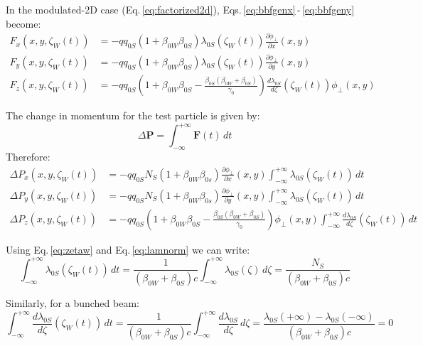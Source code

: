 In the modulated-2D case (Eq.\,\ref{eq:factorized2d}), Eqs.\,\eqref{eq:bbfgenx}\,-\,\eqref{eq:bbfgeny} become:
\begin{align}
F_x(x, y, \zeta_W(t)) &=  -q q_{0S} (1+\beta_{0W}  \beta_{0S})
\lambda_{0S}(\zeta_W(t))
 \frac{\partial \phi_\perp}{\partial x}(x, y ) \\
F_y(x, y, \zeta_W(t)) &=  -qq_{0S}  (1+\beta_{0W}  \beta_{0S})
\lambda_{0S}(\zeta_W(t))
 \frac{\partial \phi_\perp}{\partial y}(x, y ) \\
F_z(x, y, \zeta_W(t)) &=  -qq_{0S}\left(1+\beta_{0W}  \beta_{0S} -\frac{\beta_{0S}(\beta_{0W}+\beta_{0S})}{\gamma_0}\right) \frac{d \lambda_{0S}}{d \zeta}(\zeta_W(t)) \phi_\perp(x, y)
\end{align}

The change in momentum for the test particle is given by:
\begin{equation}
\Delta \textbf{P} = \int_{-\infty}^{+\infty} \textbf{F}(t) \,dt
\end{equation}
Therefore:
\begin{align}
\Delta P_x(x, y, \zeta_W(t)) &=  -qq_{0S} N_S (1+\beta_{0W}  \beta_{0s})
\frac{\partial \phi_\perp}{\partial x}(x, y ) \int_{-\infty}^{+\infty}\lambda_{0S}(\zeta_W(t)) \,dt\\
\Delta P_y(x, y, \zeta_W(t)) &=  -qq_{0S} N_S (1+\beta_{0W}  \beta_{0s})
 \frac{\partial \phi_\perp}{\partial y}(x, y ) \int_{-\infty}^{+\infty}\lambda_{0S}(\zeta_W(t)) \,dt\\
\Delta P_z(x, y, \zeta_W(t)) &=  -qq_{0S}\left(1+\beta_{0W}  \beta_{0S} -\frac{\beta_{0S}(\beta_{0W}+\beta_{0S})}{\gamma_0}\right) \phi_\perp(x, y) \int_{-\infty}^{+\infty}\frac{d \lambda_{0S}}{d \zeta}(\zeta_W(t)) \, dt
\end{align}

Using Eq.\,\eqref{eq:zetaw} and Eq.\,\eqref{eq:lamnorm} we can write:
\begin{equation}
\int_{-\infty}^{+\infty}\lambda_{0S}(\zeta_W(t)) \,dt 
=\frac{1}{(\beta_{0W}+\beta_{0S})c}\int_{-\infty}^{+\infty}\lambda_{0S}(\zeta) \,d\zeta = \frac{N_S}{(\beta_{0W}+\beta_{0S})c}
\end{equation}

Similarly, for a bunched beam:
\begin{equation}
\int_{-\infty}^{+\infty}
\frac{d \lambda_{0S}}{d \zeta}(\zeta_W(t)) \,dt 
=\frac{1}{(\beta_{0W}+\beta_{0S})c}\int_{-\infty}^{+\infty}\frac{d \lambda_{0S}}{d \zeta} \,d\zeta = \frac{ \lambda_{0S}(+\infty)-\lambda_{0S}(-\infty)}{(\beta_{0W}+\beta_{0S})c} = 0
\end{equation}

